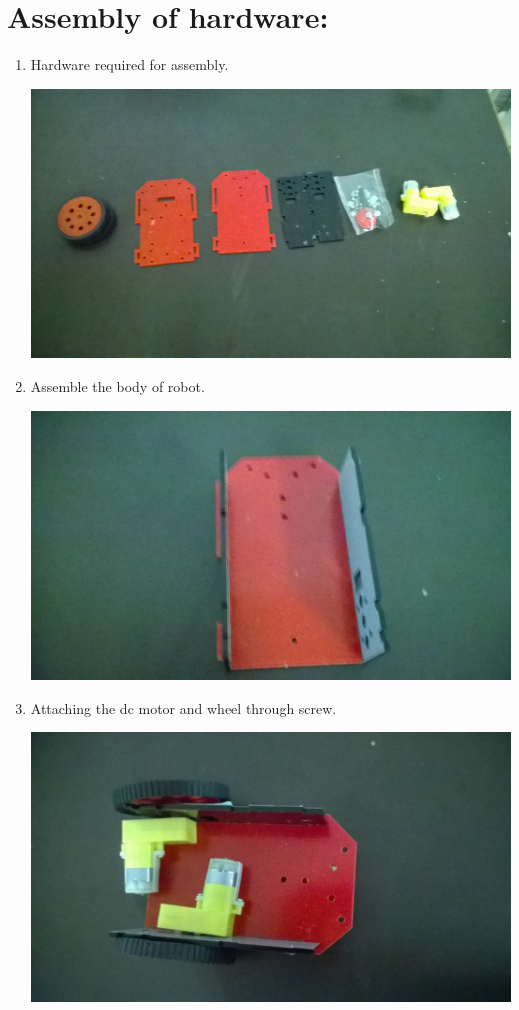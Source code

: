 \documentclass[a4paper,12pt,oneside]{book}
\begin{document}
\section{Assembly of hardware:}
\begin{enumerate}
\item Hardware required for assembly.

\includegraphics[width=400 px]{hardware.jpg}

\item Assemble the body of robot.

\includegraphics[width=400 px]{chassey.jpg}

\item Attaching the dc motor and wheel through screw.

\includegraphics[width=400 px]{attaching_dc_motor.jpg}


\end{enumerate}
\end{document}
